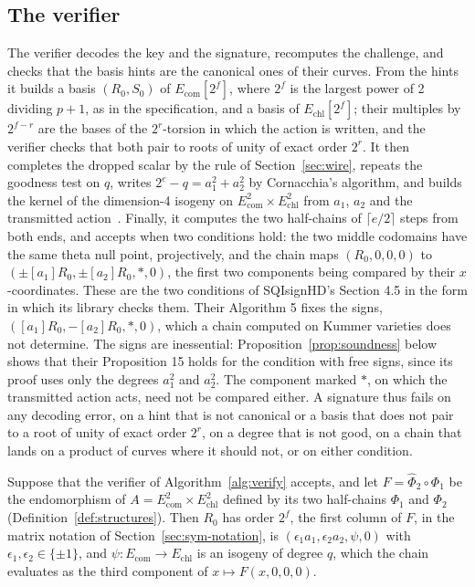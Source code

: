 \documentclass[version=preprint]{iacrcc}
\newcommand{\Ecom}{E_{\mathrm{com}}}
\newcommand{\Echl}{E_{\mathrm{chl}}}
\begin{document}
    \subsection{The verifier}
    \label{sec:verif}
    The verifier decodes the key and the signature, recomputes the challenge,
    and checks that the basis hints are the canonical ones of their curves. From the hints it builds a basis $(R_0, S_0)$ of $\Ecom[2^f]$,
    where $2^f$ is the largest power of 2 dividing $p + 1$, as in the
    specification, and a basis of $\Echl[2^f]$; their multiples by $2^{f-r}$
    are the bases of the $2^r$-torsion in which the action is written, and the
    verifier checks that both pair to roots of unity of exact order $2^r$. It
    then completes the dropped scalar by the rule of Section~\ref{sec:wire},
    repeats the goodness test on $q$, writes $2^e - q = a_1^2 + a_2^2$ by
    Cornacchia's algorithm, and builds the kernel of the dimension-4 isogeny
    on $\Ecom^2 \times \Echl^2$ from $a_1$, $a_2$ and the transmitted
    action~\cite[Lemma 4 and Section 4.4]{DLRW24}. Finally, it computes the two
    half-chains of $\lceil e/2 \rceil$ steps from both ends, and accepts when
    two conditions hold: the two middle codomains have the same theta null
    point, projectively, and the chain maps $(R_0, 0, 0, 0)$ to $(\pm[a_1]R_0,
    \pm[a_2]R_0, \ast, 0)$, the first two components being compared by their
    $x$-coordinates. These are the two conditions of SQIsignHD's Section 4.5
    in the form in which its library checks them. Their Algorithm 5 fixes the
    signs, $([a_1]R_0, -[a_2]R_0, \ast, 0)$, which a chain computed on Kummer
    varieties does not determine. The signs are inessential:
    Proposition~\ref{prop:soundness} below shows that their Proposition 15
    holds for the condition with free signs, since its proof uses only the
    degrees $a_1^2$ and $a_2^2$. The component marked $\ast$, on which the
    transmitted action acts, need not be compared either. A signature thus
    fails on any decoding error, on a hint that is not canonical or a basis
    that does not pair to a root of unity of exact order $2^r$, on a degree
    that is not good, on a chain that lands on a product of curves where it
    should not, or on either condition.

    \begin{proposition}
        \label{prop:soundness}
        Suppose that the verifier of Algorithm~\ref{alg:verify} accepts, and
        let $F = \widehat\Phi_2 \circ \Phi_1$ be the endomorphism of $A =
        \Ecom^2 \times \Echl^2$ defined by its two half-chains $\Phi_1$ and
        $\Phi_2$ (Definition~\ref{def:structures}). Then $R_0$ has order $2^f$,
        the first column of $F$, in the matrix notation of
        Section~\ref{sec:sym-notation}, is $(\epsilon_1 a_1, \epsilon_2 a_2,
        \psi, 0)$ with $\epsilon_1, \epsilon_2 \in \{\pm 1\}$, and $\psi \colon
        \Ecom \to \Echl$ is an isogeny of degree $q$, which the chain evaluates
        as the third component of $x \mapsto F(x, 0, 0, 0)$.
    \end{proposition}
\end{document}
